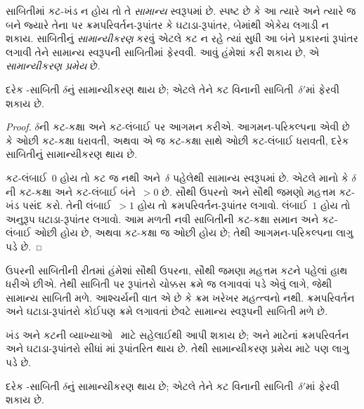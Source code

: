 સાબિતીમાં કટ-ખંડ
ન હોય તો તે
\emph{સામાન્ય} સ્વરૂપમાં
છે. સ્પષ્ટ છે કે
આ ત્યારે અને ત્યારે
જ બને જ્યારે તેના
પર ક્રમપરિવર્તન-રૂપાંતર
કે ઘટાડા-રૂપાંતર,
બેમાંથી એકેય લગાડી
ન શકાય.
સાબિતીનું
\emph{સામાન્યીકરણ} કરવું
એટલે કટ ન રહે
ત્યાં સુધી આ બંને
પ્રકારનાં રૂપાંતર
લગાવી તેને સામાન્ય
સ્વરૂપની સાબિતીમાં
ફેરવવી. આવું હંમેશાં
કરી શકાય છે, એ
\emph{સામાન્યીકરણ પ્રમેય}
છે.

\begin{thm}
દરેક -સાબિતી
$\delta$નું સામાન્યીકરણ
થાય છે; એટલે તેને
કટ વિનાની
સાબિતી~$\delta'$માં
ફેરવી શકાય છે.
\end{thm}

\begin{proof}
  $\delta$ની કટ-કક્ષા
  અને કટ-લંબાઈ પર
  આગમન કરીએ.
  આગમન-પરિકલ્પના એવી
  છે કે ઓછી કટ-કક્ષા
  ધરાવતી, અથવા એ
  જ કટ-કક્ષા સાથે
  ઓછી કટ-લંબાઈ ધરાવતી,
  દરેક સાબિતીનું
  સામાન્યીકરણ થાય છે.

  કટ-લંબાઈ~$0$
  હોય તો કટ જ
  નથી અને~$\delta$
  પહેલેથી સામાન્ય
  સ્વરૂપમાં છે.
  એટલે માનો કે
  $\delta$ની કટ-કક્ષા
  અને કટ-લંબાઈ
  બંને~$> 0$ છે.
  સૌથી ઉપરનો અને
  સૌથી જમણો મહત્તમ
  કટ-ખંડ પસંદ કરો.
  તેની લંબાઈ~$>1$
  હોય તો
  ક્રમપરિવર્તન-રૂપાંતર
  લગાવો. લંબાઈ~$1$
  હોય તો અનુરૂપ
  ઘટાડા-રૂપાંતર
  લગાવો. આમ મળતી
  નવી સાબિતીની
  કટ-કક્ષા સમાન
  અને કટ-લંબાઈ ઓછી
  હોય છે, અથવા
  કટ-કક્ષા જ ઓછી
  હોય છે; તેથી
  આગમન-પરિકલ્પના
  લાગુ પડે છે.
\end{proof}

ઉપરની સાબિતીની રીતમાં
હંમેશાં સૌથી ઉપરના,
સૌથી જમણા મહત્તમ
કટને પહેલાં હાથ
ધરીએ છીએ. તેથી
સાબિતી પર રૂપાંતરો
ચોક્કસ ક્રમે જ
લગાવવાં પડે એવું
લાગે, જેથી સામાન્ય
સાબિતી મળે.
આશ્ચર્યની વાત એ
છે કે ક્રમ ખરેખર
મહત્ત્વનો નથી.
ક્રમપરિવર્તન અને
ઘટાડા-રૂપાંતરો કોઈપણ
ક્રમે લગાવતાં છેવટે
સામાન્ય સ્વરૂપની
સાબિતી મળે છે.

ખંડ અને કટની
વ્યાખ્યાઓ~
માટે સહેલાઈથી આપી
શકાય છે; અને
 માટેનાં
ક્રમપરિવર્તન અને
ઘટાડા-રૂપાંતરો સીધાં
માં રૂપાંતરિત
થાય છે. તેથી
સામાન્યીકરણ પ્રમેય
 માટે પણ
લાગુ પડે છે.

\begin{thm}
દરેક -સાબિતી
$\delta$નું સામાન્યીકરણ
થાય છે; એટલે તેને
કટ વિનાની
સાબિતી~$\delta'$માં
ફેરવી શકાય છે.
\end{thm}
\endgroup

\begingroup
\makeatletter{}\makeatother


